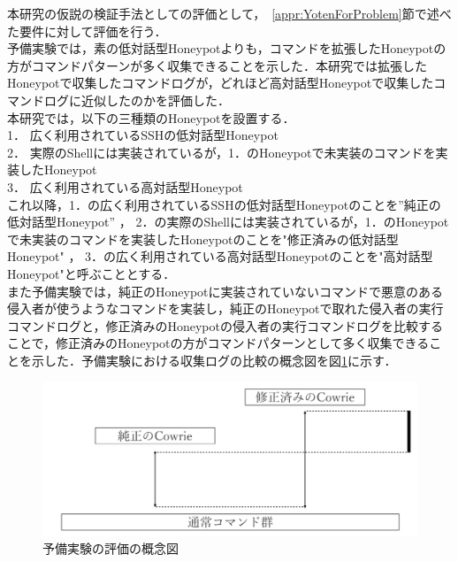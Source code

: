 本研究の仮説の検証手法としての評価として，~\ref{appr:YotenForProblem}節で述べた要件に対して評価を行う．\\
予備実験では，素の低対話型Honeypotよりも，コマンドを拡張したHoneypotの方がコマンドパターンが多く収集できることを示した．本研究では拡張したHoneypotで収集したコマンドログが，どれほど高対話型Honeypotで収集したコマンドログに近似したのかを評価した．\\
本研究では，以下の三種類のHoneypotを設置する．\\
1． 広く利用されているSSHの低対話型Honeypot\\
2． 実際のShellには実装されているが，1．のHoneypotで未実装のコマンドを実装したHoneypot\\
3． 広く利用されている高対話型Honeypot\\

これ以降，1．の広く利用されているSSHの低対話型Honeypotのことを”純正の低対話型Honeypot” ， 2．の実際のShellには実装されているが，1．のHoneypotで未実装のコマンドを実装したHoneypotのことを"修正済みの低対話型Honeypot" ， 3．の広く利用されている高対話型Honeypotのことを"高対話型Honeypot"と呼ぶこととする．\\


また予備実験では，純正のHoneypotに実装されていないコマンドで悪意のある侵入者が使うようなコマンドを実装し，純正のHoneypotで取れた侵入者の実行コマンドログと，修正済みのHoneypotの侵入者の実行コマンドログを比較することで，修正済みのHoneypotの方がコマンドパターンとして多く収集できることを示した．予備実験における収集ログの比較の概念図を図\ref{fig:yobigainen}に示す．

\begin{figure}[htbp]
    \centering
    \includegraphics[width=1.0\textwidth]{figures/termhyoka.png}
    \caption{予備実験の評価の概念図}
    \label{fig:yobigainen}
\end{figure}

